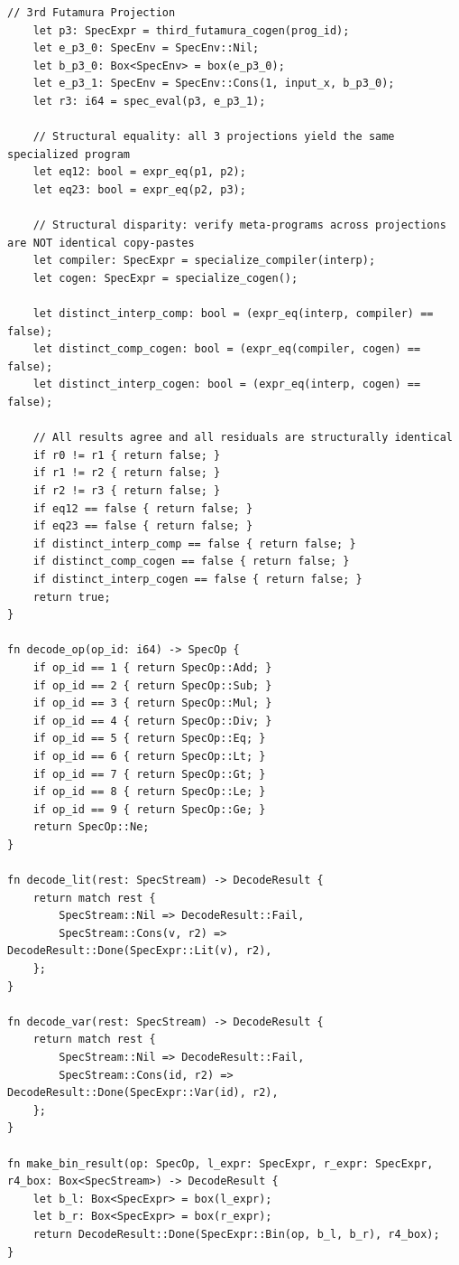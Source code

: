 \begin{lstlisting}[language=NumLang, caption={Full Annotated Source of the NumLang Self-Applicable Specializer (\texttt{src/stdlib/minspec.nl}).}, label={lst:minspec_nl_full}]
    // 3rd Futamura Projection
    let p3: SpecExpr = third_futamura_cogen(prog_id);
    let e_p3_0: SpecEnv = SpecEnv::Nil;
    let b_p3_0: Box<SpecEnv> = box(e_p3_0);
    let e_p3_1: SpecEnv = SpecEnv::Cons(1, input_x, b_p3_0);
    let r3: i64 = spec_eval(p3, e_p3_1);

    // Structural equality: all 3 projections yield the same specialized program
    let eq12: bool = expr_eq(p1, p2);
    let eq23: bool = expr_eq(p2, p3);

    // Structural disparity: verify meta-programs across projections are NOT identical copy-pastes
    let compiler: SpecExpr = specialize_compiler(interp);
    let cogen: SpecExpr = specialize_cogen();

    let distinct_interp_comp: bool = (expr_eq(interp, compiler) == false);
    let distinct_comp_cogen: bool = (expr_eq(compiler, cogen) == false);
    let distinct_interp_cogen: bool = (expr_eq(interp, cogen) == false);

    // All results agree and all residuals are structurally identical
    if r0 != r1 { return false; }
    if r1 != r2 { return false; }
    if r2 != r3 { return false; }
    if eq12 == false { return false; }
    if eq23 == false { return false; }
    if distinct_interp_comp == false { return false; }
    if distinct_comp_cogen == false { return false; }
    if distinct_interp_cogen == false { return false; }
    return true;
}

fn decode_op(op_id: i64) -> SpecOp {
    if op_id == 1 { return SpecOp::Add; }
    if op_id == 2 { return SpecOp::Sub; }
    if op_id == 3 { return SpecOp::Mul; }
    if op_id == 4 { return SpecOp::Div; }
    if op_id == 5 { return SpecOp::Eq; }
    if op_id == 6 { return SpecOp::Lt; }
    if op_id == 7 { return SpecOp::Gt; }
    if op_id == 8 { return SpecOp::Le; }
    if op_id == 9 { return SpecOp::Ge; }
    return SpecOp::Ne;
}

fn decode_lit(rest: SpecStream) -> DecodeResult {
    return match rest {
        SpecStream::Nil => DecodeResult::Fail,
        SpecStream::Cons(v, r2) => DecodeResult::Done(SpecExpr::Lit(v), r2),
    };
}

fn decode_var(rest: SpecStream) -> DecodeResult {
    return match rest {
        SpecStream::Nil => DecodeResult::Fail,
        SpecStream::Cons(id, r2) => DecodeResult::Done(SpecExpr::Var(id), r2),
    };
}

fn make_bin_result(op: SpecOp, l_expr: SpecExpr, r_expr: SpecExpr, r4_box: Box<SpecStream>) -> DecodeResult {
    let b_l: Box<SpecExpr> = box(l_expr);
    let b_r: Box<SpecExpr> = box(r_expr);
    return DecodeResult::Done(SpecExpr::Bin(op, b_l, b_r), r4_box);
}


\end{lstlisting}
